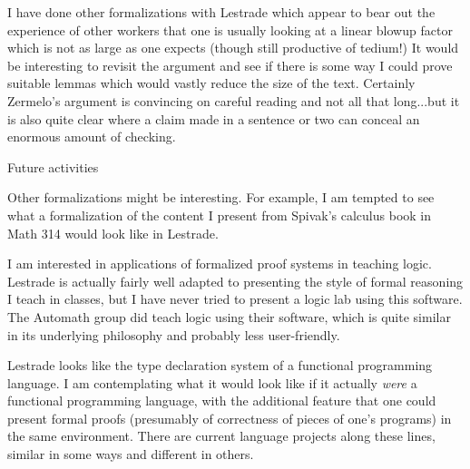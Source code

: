 \documentclass{slides}
\begin{document}
\begin{slide}

 I have done other formalizations with Lestrade which appear to bear out the experience of other workers that one is usually looking at a linear blowup factor which is not as large as one expects (though still productive of tedium!)  It would be interesting to revisit the argument and see if there is some way I could prove suitable lemmas which would vastly reduce the size of the text.  Certainly Zermelo's argument is convincing on careful reading and not all that long...but it is also quite clear where a claim made in a sentence or two can conceal an enormous amount of checking.

\end{slide}

\begin{slide}

{\Large Future activities}

Other formalizations might be interesting.  For example, I am tempted to see what a formalization of the content I present from Spivak's calculus book in Math 314 would look like in Lestrade.

I am interested in applications of formalized proof systems in teaching logic.  Lestrade is actually fairly well adapted to presenting the style of formal reasoning I teach in classes, but I have never tried to present a logic lab using this software.  The Automath group did teach logic using their software, which is quite similar in its underlying philosophy and probably less user-friendly.

\end{slide}

\begin{slide}

Lestrade looks like the type declaration system of a functional programming language.  I am contemplating what it would look like if it actually {\em were\/} a functional programming language, with the additional feature that one could present formal proofs (presumably of correctness of pieces of one's programs) in the same environment.  There are current language projects along these lines, similar in some ways and different in others.

\end{slide}
\end{document}
